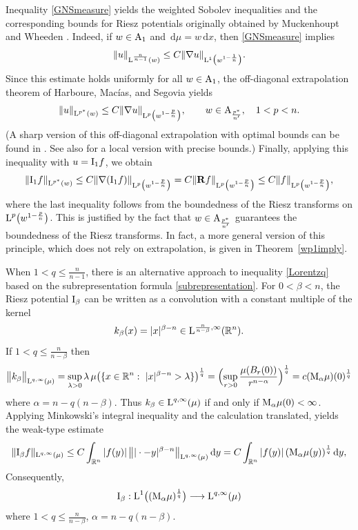 \documentclass[11pt, a4paper, reqno]{amsart}
\newcommand{\R}{\mathbb R}
\newcommand{\A}{\textup A}
\newcommand{\al}{\alpha}
\newcommand{\dx}{\,{\mathrm dx}}
\newcommand{\dmu}{\,{\mathrm d\mu}}
\newcommand{\dy}{\,{\mathrm dy}}
\newcommand{\Lup}{\textup{L}}
\theoremstyle{definition}
\theoremstyle{remark}
\begin{document}
Inequality \eqref{GNSmeasure} yields the weighted Sobolev inequalities and the corresponding bounds for Riesz potentials originally obtained by Muckenhoupt and Wheeden \cite{MW}. Indeed, if $w\in \textup{A}_1$ and $\dmu = w\dx$, then \eqref{GNSmeasure} implies
\[
\|u\|_{\Lup^{\frac{n}{n-1}}(w)}
\le C \|\nabla u\|_{\Lup^1\bigl(w^{1-\frac1n}\bigr)}.
\]
Since this estimate holds uniformly for all $w\in \textup{A}_1$, the off-diagonal extrapolation theorem of Harboure, Mac\'ias, and Segovia \cite{HMS} yields
\[
\|u\|_{\Lup^{p^*}(w)}
\le C \|\nabla u\|_{\Lup^p\bigl(w^{1-\frac{p}{n}}\bigr)},
\qquad
w\in \A_{\frac{p^*}{n'}}, \quad 1<p<n.
\]
(A sharp version of this off-diagonal extrapolation with optimal bounds can be found in \cite{LMPT}. See also \cite[Corollary 1.4]{PR2} for a local version with precise bounds.) Finally, applying this inequality with $u = \textup{I}_1 f$, we obtain
\[
\|\textup{I}_1 f\|_{\Lup^{p^*}(w)}
\le C \|\nabla(\textup{I}_1 f)\|_{\Lup^p\bigl(w^{1-\frac{p}{n}}\bigr)}
= C \|\mathbf R f\|_{\Lup^p\bigl(w^{1-\frac{p}{n}}\bigr)}
\le C \|f\|_{\Lup^p\bigl(w^{1-\frac{p}{n}}\bigr)},
\]
where the last inequality follows from the boundedness of the Riesz transforms on $\Lup^p\bigl(w^{1-\frac{p}{n}}\bigr)$. This is justified by the fact that $w\in \A_{\frac{p^*}{n'}}$ guarantees the boundedness of the Riesz transforms. In fact, a more general version of this principle, which does not rely on extrapolation, is given in Theorem~\ref{wp1imply}.


When $1<q\leq \frac{n}{n-1}$, there is an alternative approach to inequality
\eqref{Lorentzq} based on the subrepresentation formula \eqref{subrepresentation}.
For $0<\beta<n$, the Riesz potential $\textup{I}_\beta$ can be written as a
convolution with a constant multiple of the kernel
\[
k_\beta(x)=|x|^{\beta-n}
\in \Lup^{\frac{n}{n-\beta},\infty}(\R^n).
\]
If $1<q\leq \frac{n}{n-\beta}$ then
\begin{equation*}
\bigl\|k_\beta\bigr\|_{\Lup^{q,\infty}(\mu)}= \sup_{\lambda>0}\lambda\,\mu\bigl(\{x\in\R^n:\ |x|^{\beta-n}>\lambda\}\bigr)^{\frac1q}=\Bigl(\sup_{r>0}\frac{\mu(B_r(0))}{r^{n-\al}}\Bigr)^{\frac{1}{q}}=c(\textup{M}_\al\mu)(0)^\frac1q
\end{equation*}
where $\al=n-q(n-\beta)$. Thus $k_\beta\in \Lup^{q,\infty}(\mu)$ if and only if $\textup M_{\al}\mu(0)<\infty$.  Applying Minkowski’s integral inequality and the calculation translated, yields the weak-type estimate
\begin{equation}\label{Minkow}
\|\textup{I}_\beta f\|_{\Lup^{q,\infty}(\mu)}
\le C \int_{\R^n} |f(y)|
\,\bigl\||\cdot-y|^{\beta-n}\bigr\|_{\Lup^{q,\infty}(\mu)}\dy
= C \int_{\R^n} |f(y)|\, (\textup{M}_\al\mu(y))^{\frac{1}{q}}\dy,
\end{equation}
Consequently,
\[
\textup{I}_\beta:\Lup^1\bigl((\textup{M}_\al\mu)^{\frac{1}{q}}\bigr)
\longrightarrow \Lup^{q,\infty}(\mu)
\]
where $1<q\leq \frac{n}{n-\beta}$, $\al=n-q(n-\beta)$.
\end{document}
